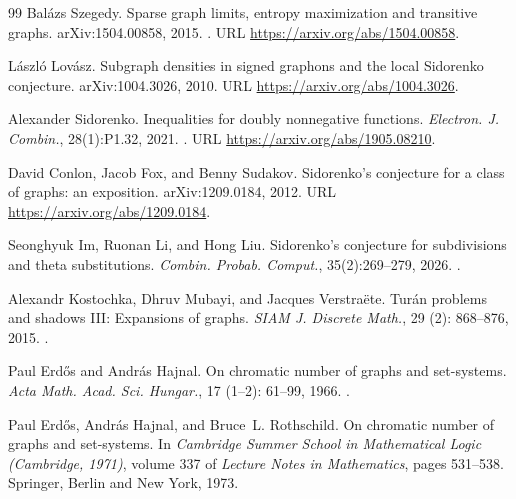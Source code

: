 \documentclass[a4paper,11pt,reqno]{amsart}
\theoremstyle{plain}
\theoremstyle{definition}
\theoremstyle{remark}
\begin{document}
\begin{thebibliography}{99}
Bal{\'a}zs Szegedy.
\newblock Sparse graph limits, entropy maximization and transitive graphs.
\newblock arXiv:1504.00858, 2015.
\newblock {}.
\newblock URL \url{https://arxiv.org/abs/1504.00858}.

L{\'a}szl{\'o} Lov{\'a}sz.
\newblock Subgraph densities in signed graphons and the local Sidorenko conjecture.
\newblock arXiv:1004.3026, 2010.
\newblock URL \url{https://arxiv.org/abs/1004.3026}.

Alexander Sidorenko.
\newblock Inequalities for doubly nonnegative functions.
\newblock \emph{Electron. J. Combin.}, 28(1):P1.32, 2021.
\newblock {}.
\newblock URL \url{https://arxiv.org/abs/1905.08210}.

David Conlon, Jacob Fox, and Benny Sudakov.
\newblock Sidorenko's conjecture for a class of graphs: an exposition.
\newblock arXiv:1209.0184, 2012.
\newblock URL \url{https://arxiv.org/abs/1209.0184}.

Seonghyuk Im, Ruonan Li, and Hong Liu.
\newblock Sidorenko's conjecture for subdivisions and theta substitutions.
\newblock \emph{Combin. Probab. Comput.}, 35(2):269--279, 2026.
\newblock {}.

Alexandr Kostochka, Dhruv Mubayi, and Jacques Verstra{\"e}te.
\newblock Tur{\'a}n problems and shadows III: Expansions of graphs.
\newblock \emph{SIAM J. Discrete Math.}, 29 (2): 868--876, 2015.
\newblock {}.

Paul Erd{\H{o}}s and Andr{\'a}s Hajnal.
\newblock On chromatic number of graphs and set-systems.
\newblock \emph{Acta Math. Acad. Sci. Hungar.}, 17
  (1--2): 61--99, 1966.
\newblock {}.

Paul Erd{\H{o}}s, Andr{\'a}s Hajnal, and Bruce~L. Rothschild.
\newblock On chromatic number of graphs and set-systems.
\newblock In \emph{Cambridge Summer School in Mathematical Logic (Cambridge,
  1971)}, volume 337 of \emph{Lecture Notes in Mathematics}, pages 531--538.
  Springer, Berlin and New York, 1973.


\end{thebibliography}
\end{document}
